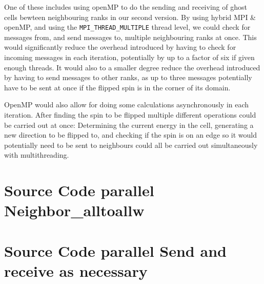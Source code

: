 \documentclass{article}
\begin{document}
One of these includes using openMP to do the sending and receiving of ghost cells bewteen neighbouring ranks in our second version. By using hybrid MPI \& openMP, and using the \texttt{MPI\_THREAD\_MULTIPLE} thread level, we could check for messages from, and send messages to, multiple neighbouring ranks at once. This would significantly reduce the overhead introduced by having to check for incoming messages in each iteration, potentially by up to a factor of six if given enough threads. It would also to a smaller degree reduce the overhead introduced by having to send messages to other ranks, as up to three messages potentially have to be sent at once if the flipped spin is in the corner of its domain.

OpenMP would also allow for doing some calculations asynchronously in each iteration. After finding the spin to be flipped multiple different operations could be carried out at once: Determining the current energy in the cell, generating a new direction to be flipped to, and checking if the spin is on an edge so it would potentially need to be sent to neighbours could all be carried out simultaneously with multithreading.

\printbibliography
\appendix
\setcounter{page}{0}
\renewcommand{\thepage}{\roman{page}}
\newpage
\section{Source Code parallel Neighbor\_alltoallw}
\label{sec:source_v1}

\section{Source Code parallel Send and receive as necessary}
\label{sec:source_v2}

\end{document}
